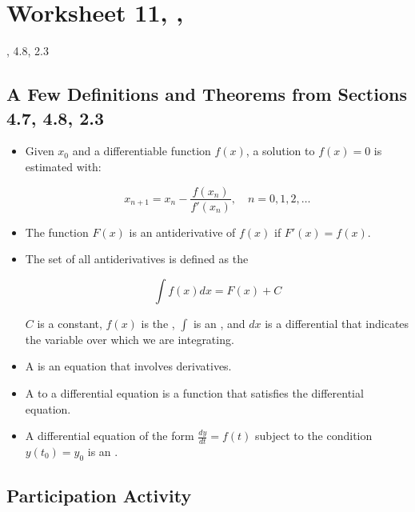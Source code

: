 \newpage\section*{Worksheet 11, \Course, \Semester} 
\noindent {}, 4.8, 2.3 %

\subsection*{A Few Definitions and Theorems from Sections 4.7, 4.8, 2.3}

	\begin{itemize}
    	\item {} Given $x_0$ and a differentiable function $f(x)$, a solution to $f(x)=0$ is estimated with:
        
         $$x_{n+1} = x_n - \frac{f(x_n)}{f'(x_n)}, \quad n= 0, 1, 2, \ldots$$
        
        \item {} The function $F(x)$ is an antiderivative of $f(x)$ if $F'(x) = f(x)$. 
      
        
        \item {} The set of all antiderivatives is defined as the  
        
        $$\int f(x) dx = F(x) + C$$
        
        $C$ is a constant, $f(x)$ is the , $\int$ is an , and $dx$ is a differential that indicates the variable over which we are integrating. 
        
        \item A  is an equation that involves derivatives. 
        
        \item A  to a differential equation is a function that satisfies the differential equation. 
        
        \item A differential equation of the form $\frac{dy}{dt} = f(t)$ subject to the condition $y(t_0) = y_0$ is an .
        
    \end{itemize}


\subsection*{Participation Activity}

